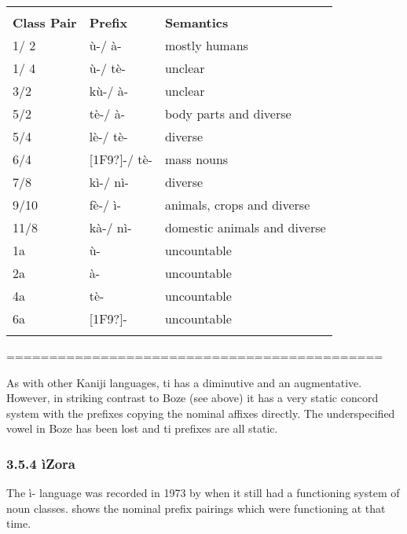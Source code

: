 \documentclass[output=paper]{langsci/langscibook}
\begin{document}
\begin{tabularx}{\textwidth}{XXX}
\lsptoprule
\multicolumn{3}{c}{{\itshape \textbf{{\tabref{tab:key:16}}}\textbf{{: ti\ili{Map} nominal prefix pairings and semantics}}}

\itshape \textbf{{=========================================}}}\\
\textbf{Class Pair} & \textbf{Prefix} & \textbf{Semantics}\\
1/ 2 & ù-/ à- & mostly humans\\
1/ 4 & ù-/ tè- & unclear\\
3/2 & kù-/ à- & unclear\\
5/2 & tè-/ à- & body parts and diverse\\
5/4 & lè-/ tè- & diverse\\
6/4 & [1F9?]{}-/ tè- & mass nouns\\
7/8 & kì-/ nì- & diverse\\
9/10 & fè-/ ì- & animals, crops and diverse\\
11/8 & kà-/ nì- & domestic animals and diverse\\
1a & ù- & uncountable\\
2a & à- & uncountable\\
4a & tè- & uncountable\\
6a & [1F9?]{}- & uncountable\\
\lspbottomrule
\end{tabularx}
         ============================================

As with other Kaniji languages, ti has a diminutive and an augmentative. However, in striking contrast to Boze (see above) it has a very static concord system with the prefixes copying the nominal affixes directly. The underspecified vowel in Boze has been lost and ti prefixes are all static. 


\subsubsection{3.5.4 ìZora}

The ì- language was recorded in 1973 by \citet{Shimizu1973} when it still had a functioning system of noun classes.  shows the nominal prefix pairings which were functioning at that time.
\end{document}
